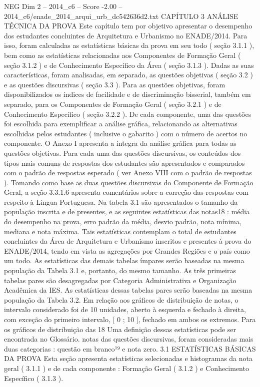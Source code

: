 \begin{textsample}{NEG Dim 2 – 2014\_c6 – Score -2.00 – 2014\_c6/enade\_2014\_arqui\_urb\_dc542636d2.txt}  \label{ex:f2_neg_208}
CAPÍTULO 3 ANÁLISE TÉCNICA DA PROVA Este capítulo tem por objetivo apresentar o desempenho dos estudantes concluintes de Arquitetura e Urbanismo no ENADE/2014.
Para isso, foram calculadas as estatísticas básicas da prova em seu todo ( seção 3.1.1 ), bem como as estatísticas relacionadas aos Componentes de Formação Geral ( seção 3.1.2 ) e de Conhecimento Específico da Área ( seção 3.1.3 ).
Dadas as suas características, foram analisadas, em separado, as questões objetivas ( seção 3.2 ) e as questões discursivas ( seção 3.3 ).
Para as questões objetivas, foram disponibilizados os índices de facilidade e de discriminação bisserial, também em separado, para os Componentes de Formação Geral ( seção 3.2.1 ) e de Conhecimento Específico ( seção 3.2.2 ).
De cada componente, uma das questões foi escolhida para exemplificar a análise gráfica, relacionando as alternativas escolhidas pelos estudantes ( inclusive o gabarito ) com o número de acertos no componente.
O Anexo I apresenta a íntegra da análise gráfica para todas as questões objetivas.
Para cada uma das questões discursivas, os conteúdos dos tipos mais comuns de respostas dos estudantes são apresentados e comparados com o padrão de respostas esperado ( ver Anexo VIII com o padrão de respostas ).
Tomando como base as duas questões discursivas do Componente de Formação Geral, a seção 3.3.1.6 apresenta comentários sobre a correção das respostas com respeito à Língua Portuguesa.
Na tabela 3.1 são apresentados o tamanho da população inscrita e de presentes, e as seguintes estatísticas das notas18 : média do desempenho na prova, erro padrão da média, desvio padrão, nota mínima, mediana e nota máxima.
Tais estatísticas contemplam o total de estudantes concluintes da Área de Arquitetura e Urbanismo inscritos e presentes à prova do ENADE/2014, tendo em vista as agregações por Grandes Regiões e o país como um todo.
As estatísticas das demais tabelas ímpares serão baseadas na mesma população da Tabela 3.1 e, portanto, do mesmo tamanho.
As três primeiras tabelas pares são desagregadas por Categoria Administrativa e Organização Acadêmica da IES.
As estatísticas dessas tabelas pares serão baseadas na mesma população da Tabela 3.2.
Em relação aos gráficos de distribuição de notas, o intervalo considerado foi de 10 unidades, aberto à esquerda e fechado à direita, com exceção do primeiro intervalo, [ 0 ; 10 ], fechado em ambos os extremos.
Para os gráficos de distribuição das 18 Uma definição dessas estatísticas pode ser encontrada no Glossário. notas das questões discursivas, foram consideradas mais duas categorias : questão em branco¹⁹ e nota zero. 3.1 ESTATÍSTICAS BÁSICAS DA PROVA Esta seção apresenta estatísticas selecionadas e histogramas da nota geral ( 3.1.1 ) e de cada componente : Formação Geral ( 3.1.2 ) e Conhecimento Específico ( 3.1.3 ).

\end{textsample}
